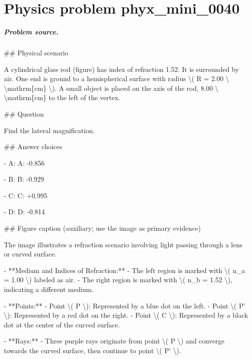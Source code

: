 
\chapter{Physics problem phyx\_mini\_0040}
\label{ch:PhyXMiniProblems_problem_phyx_mini_0040}

\paragraph{Problem source.}
\#\# Physical scenario

A cylindrical glass rod (figure) has index of refraction 1.52. It is surrounded by air. One end is ground to a hemispherical surface with radius \textbackslash{}( R = 2.00 \textbackslash{} \textbackslash{}mathrm\{cm\} \textbackslash{}). A small object is placed on the axis of the rod, 8.00 \textbackslash{} \textbackslash{}mathrm\{cm\} to the left of the vertex.

\#\# Question

Find the lateral magnification.

\#\# Answer choices

- A: A: -0.856

- B: B: -0.929

- C: C: +0.995

- D: D: -0.814

\#\# Figure caption (auxiliary; use the image as primary evidence)

The image illustrates a refraction scenario involving light passing through a lens or curved surface.

- **Medium and Indices of Refraction:**
  - The left region is marked with \textbackslash{}( n\_a = 1.00 \textbackslash{}) labeled as air.
  - The right region is marked with \textbackslash{}( n\_b = 1.52 \textbackslash{}), indicating a different medium.

- **Points:**
  - Point \textbackslash{}( P \textbackslash{}): Represented by a blue dot on the left.
  - Point \textbackslash{}( P' \textbackslash{}): Represented by a red dot on the right.
  - Point \textbackslash{}( C \textbackslash{}): Represented by a black dot at the center of the curved surface.

- **Rays:**
  - Three purple rays originate from point \textbackslash{}( P \textbackslash{}) and converge towards the curved surface, then continue to point \textbackslash{}( P' \textbackslash{}).

